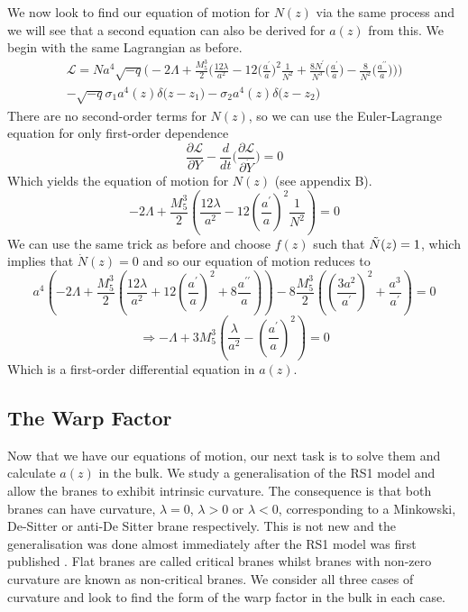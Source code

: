 \documentclass[11pt]{report}
\numberwithin{equation}{chapter}
\begin{document}
\noindent We now look to find our equation of motion for $N(z)$ via the same process and we will see that a second equation can also be derived for $a(z)$ from this. We begin with the same Lagrangian as before.
\begin{multline}
    \mathcal{L}=Na^4\sqrt {-q}\bigg(-2\Lambda+\frac{M^3_5}{2}\bigg(\frac{12\lambda}{a^2}-12\bigg(\frac{a^\prime}{a}\bigg)^2\frac{1}{N^2}+\frac{8N^\prime}{N^3}\bigg(\frac{a^\prime}{a}\bigg)-\frac{8}{N^2}\bigg(\frac{a^{\prime\prime}}{a}\bigg)\bigg)\bigg)\\
    -\sqrt{-q}\sigma_1a^4(z)\delta\big(z-z_1\big)-\sigma_2a^4(z)\delta\big(z-z_2\big)
\end{multline}
There are no second-order terms for $N(z)$, so we can use the Euler-Lagrange equation for only first-order dependence
\begin{equation}
    \frac{\partial\mathcal{L}}{\partial Y}-\frac{d}{dt}\bigg(\frac{\partial\mathcal{L}}{\partial \Dot{Y}}\bigg)=0
\end{equation}
Which yields the equation of motion for $N(z)$ (see appendix B).
\begin{equation}
    -2\Lambda +\frac{M^3_5}{2}\left(\frac{12\lambda}{a^2}-12\left(\frac{a^\prime}{a}\right)^2\frac{1}{N^2}\right) = 0
\end{equation}
We can use the same trick as before and choose $f(z)$ such that $\Tilde{N}(z)=1$, which implies that $\Dot{N}(z)=0$ and so our equation of motion reduces to
\begin{equation}
    a^4\left(-2\Lambda+\frac{M^3_5}{2}\left(\frac{12\lambda}{a^2}+12\left(\frac{a^\prime}{a}\right)^2+8\frac{a^{\prime\prime}}{a}\right)\right)-8\frac{M^3_5}{2}\left(\left(\frac{3a^2}{a^\prime}\right)^2+\frac{a^3}{a^\prime}\right)=0
\end{equation}
\begin{equation}
    \Rightarrow -\Lambda+3M^3_5\left(\frac{\lambda}{a^2}-\left(\frac{a^\prime}{a}\right)^2\right)=0
\end{equation}
Which is a first-order differential equation in $a(z)$.
\subsection{The Warp Factor}
Now that we have our equations of motion, our next task is to solve them and calculate $a(z)$ in the bulk. We study a generalisation of the RS1 model and allow the branes to exhibit intrinsic curvature. The consequence is that both branes can have curvature, $\lambda = 0$, $\lambda > 0$ or $\lambda <0$, corresponding to a Minkowski, De-Sitter or anti-De Sitter brane respectively. This is not new and the generalisation was done almost immediately after the RS1 model was first published \cite{Karch:2000ct}. Flat branes are called critical branes whilst branes with non-zero curvature are known as non-critical branes. We consider all three cases of curvature and look to find the form of the warp factor in the bulk in each case.
\end{document}
